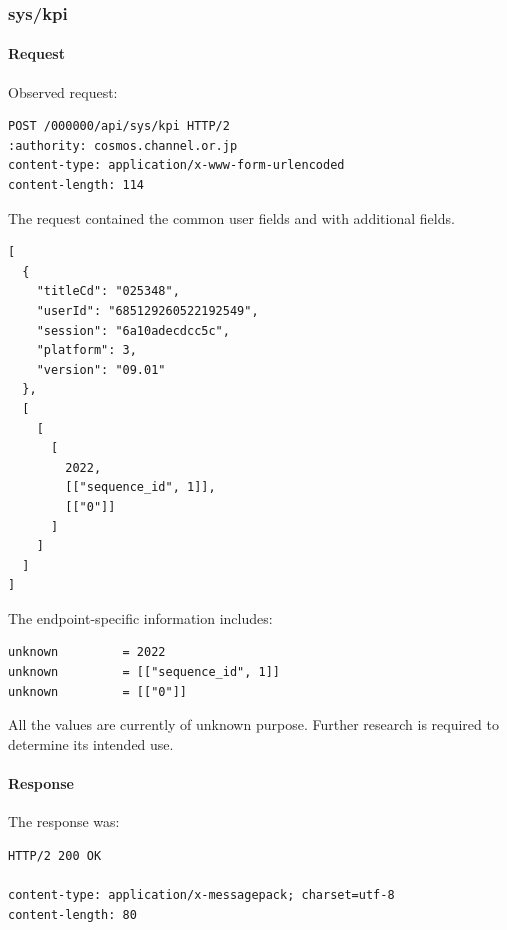 \subsubsection{sys/kpi}
\label{subsec:api_sys_kpi}

\paragraph{Request}

Observed request:

\begin{lstlisting}
POST /000000/api/sys/kpi HTTP/2
:authority: cosmos.channel.or.jp
content-type: application/x-www-form-urlencoded
content-length: 114
\end{lstlisting}

The request contained the common user fields and with additional fields.

\begin{lstlisting}
[
  {
    "titleCd": "025348",
    "userId": "685129260522192549",
    "session": "6a10adecdcc5c",
    "platform": 3,
    "version": "09.01"
  },
  [
    [
      [
        2022,
        [["sequence_id", 1]],
        [["0"]]
      ]
    ]
  ]
]
\end{lstlisting}

The endpoint-specific information includes:

\begin{lstlisting}
unknown         = 2022
unknown         = [["sequence_id", 1]]
unknown         = [["0"]]
\end{lstlisting}

\begin{tcolorbox}[colback=yellow!10,colframe=orange!80!black,title=Warning]
All the values are currently of unknown purpose.
Further research is required to determine its intended use.
\end{tcolorbox}

\newpage

\paragraph{Response}

The response was:

\begin{lstlisting}
HTTP/2 200 OK

content-type: application/x-messagepack; charset=utf-8
content-length: 80
\end{lstlisting}

